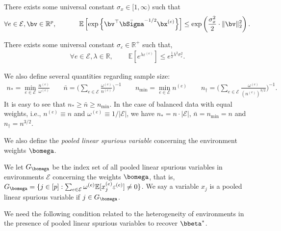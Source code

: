 \documentclass[10pt]{article}
\numberwithin{equation}{section}
\begin{document}
\begin{condition}
\label{cond2-subgaussain-x}
	There exists some universal constant $\sigma_x \in [1,\infty)$ such that
	\begin{align}
		\forall e\in \mathcal{E}, \bv \in \mathbb{R}^p, ~~~~~~~~~~ \mathbb{E} \left[\exp\left\{\bv^\top \bar{\bSigma}^{-1/2}\bx^{(e)}\right\}\right] \le \exp\left(\frac{\sigma_x^2}{2} \cdot \|\bv\|_2^2\right).
	\end{align}
\end{condition}

\begin{condition}
\label{cond3-sub-gaussian-eps}
	There exists some universal constant $\sigma_\varepsilon \in \mathbb{R}^+$ such that,
	\begin{align}
		\forall e\in \mathcal{E}, \lambda \in \mathbb{R}, ~~~~~~~~~~ \mathbb{E} [e^{\lambda \varepsilon^{(e)}}] \le e^{\frac{1}{2} \lambda^2 \sigma_\varepsilon^2}.
	\end{align}
\end{condition}

We also define several quantities regarding sample size:
\begin{align}
    \label{eq:def-n-low-dim}
    n_* =\min_{e\in \mathcal{E}} \frac{n^{(e)}} {\omega^{(e)}} \qquad \bar{n} = \Bigg(\sum_{e\in \mathcal{E}}\frac{\omega^{(e)}}{n^{(e)}}\Bigg)^{-1} \qquad n_{\min} = \min_{e\in \mathcal{E}} n^{(e)} \qquad n_\dagger = \Bigg( \sum_{e\in \mathcal{E}} \frac{\omega^{(e)}}{(n^{(e)})^{3/2}} \Bigg)^{-1}.
\end{align}
It is easy to see that $n_* \ge \bar{n} \ge n_{\min}$. In the case of balanced data with equal weights, i.e., $n^{(e)} \equiv n$ and $\omega^{(e)} \equiv 1/|\mathcal{E}|$, we have $n_* = n\cdot |\mathcal{E}|$, $\bar{n}=n_{\min} = n$ and $n_\dagger=n^{3/2}$.

We also define the {\it pooled linear spurious variable} concerning the environment weights $\bomega$.

\begin{definition} We let $G_{\bomega}$ be the index set of all pooled linear spurious variables in environments $\mathcal{E}$ concerning the weights $\bomega$, that is,
		$G_{\bomega} = \{j \in [p]:  \sum_{e\in \mathcal{E}} \omega^{(e)} \mathbb{E}[x_j^{(e)}\varepsilon^{(e)}] \neq 0 \}$. We say a variable $x_j$ is a pooled linear spurious variable if $j\in G_{\bomega}$.
\end{definition}

We need the following condition related to the heterogeneity of environments in the presence of pooled linear spurious variables to recover $\bbeta^*$.
\end{document}
